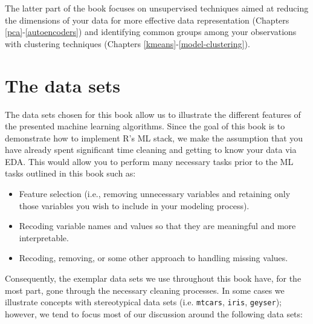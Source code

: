 \documentclass[]{krantz}
\providecommand{\tightlist}{%
  \setlength{\itemsep}{0pt}\setlength{\parskip}{0pt}}
\begin{document}
The latter part of the book focuses on unsupervised techniques aimed at reducing the dimensions of your data for more effective data representation (Chapters \ref{pca}-\ref{autoencoders}) and identifying common groups among your observations with clustering techniques (Chapters \ref{kmeans}-\ref{model-clustering}).

\hypertarget{data}{%
\section{The data sets}\label{data}}

The data sets chosen for this book allow us to illustrate the different features of the presented machine learning algorithms. Since the goal of this book is to demonstrate how to implement R's ML stack, we make the assumption that you have already spent significant time cleaning and getting to know your data via EDA. This would allow you to perform many necessary tasks prior to the ML tasks outlined in this book such as:

\begin{itemize}
\tightlist
\item
  Feature selection (i.e., removing unnecessary variables and retaining only those variables you wish to include in your modeling process).
\item
  Recoding variable names and values so that they are meaningful and more interpretable.
\item
  Recoding, removing, or some other approach to handling missing values.
\end{itemize}

Consequently, the exemplar data sets we use throughout this book have, for the most part, gone through the necessary cleaning processes. In some cases we illustrate concepts with stereotypical data sets (i.e. \texttt{mtcars}, \texttt{iris}, \texttt{geyser}); however, we tend to focus most of our discussion around the following data sets:
\end{document}
